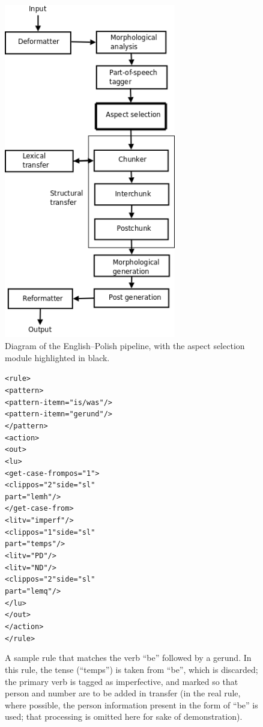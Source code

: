 \documentclass[11pt]{article}
\begin{document}
\begin{figure}[!ht]
\begin{center}
\includegraphics*[width=7.5cm]{aspectselect.png}
\end{center}
\caption{Diagram of the English--Polish pipeline, with the aspect selection
module highlighted in black.}
\label{fig:modules}
\end{figure}


\begin{figure}[htbp]
\label{figure:rule}
\begin{small}
\begin{alltt}
<rule>
  <pattern>
    <pattern-item n="is/was"/>
    <pattern-item n="gerund"/>
  </pattern>
  <action>
    <out>
      <lu>
        <get-case-from pos="1">
          <clip pos="2" side="sl" 
           part="lemh"/>
        </get-case-from>
        <lit v="imperf"/>
        <clip pos="1" side="sl" 
         part="temps"/>
        <lit v="PD"/>
        <lit v="ND"/>
        <clip pos="2" side="sl" 
         part="lemq"/>
      </lu>  
    </out>
  </action>
</rule>
\end{alltt}
\end{small}
\caption{A sample rule that matches the verb ``be'' followed by a
gerund. In this rule, the tense (``temps'') is taken from ``be'', which
is discarded; the primary verb is tagged as imperfective, and marked so
that person and number are to be added in transfer (in the real rule, 
where possible, the person information present in the form of ``be'' is
used; that processing is omitted here for sake of demonstration).}
\end{figure}
\end{document}
